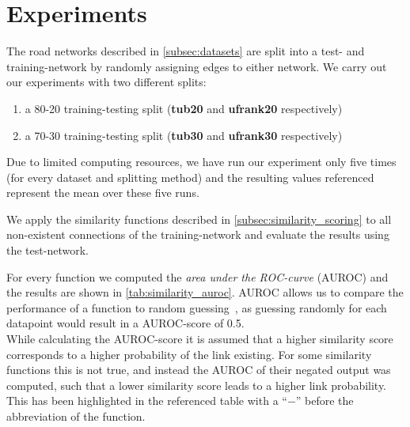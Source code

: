 \documentclass[12pt,a4paper]{IEEEtran}
\newcommand{\n}{\ensuremath{-}}
\begin{document}
\section{Experiments}

The road networks described in \autoref{subsec:datasets} are split into a
test- and training-network by randomly assigning edges to either network.
We carry out our experiments with two different splits:
\begin{enumerate}
\item a 80-20 training-testing split (\textbf{tub20} and \textbf{ufrank20} respectively)
\item a 70-30 training-testing split (\textbf{tub30} and \textbf{ufrank30} respectively)
\end{enumerate}
Due to limited computing resources, we have run our experiment only five times
(for every dataset and splitting method) and the resulting values
referenced represent the mean over these five runs.

We apply the similarity functions described in \autoref{subsec:similarity_scoring}
to all non-existent connections of the training-network and evaluate the results using the test-network.

For every function we computed the \emph{area under the ROC-curve} (AUROC) and the results are shown in \autoref{tab:similarity_auroc}.
AUROC allows us to compare the performance of a function to random guessing~\cite[see][40]{informedness},
as guessing randomly for each datapoint would result in a AUROC-score of 0.5.\\
While calculating the AUROC-score it is assumed
that a higher similarity score corresponds to a higher probability of the link existing.
For some similarity functions this is not true, and instead the AUROC of their
negated output was computed, such that a lower similarity score leads to a higher link probability.
This has been highlighted in the referenced table with a \enquote{\n{}} before the abbreviation of the function.
\end{document}

